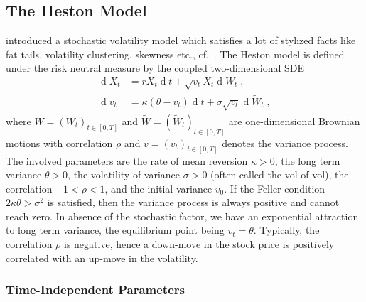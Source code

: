 \documentclass[10pt,a4paper]{article}
\numberwithin{equation}{section} %
\theoremstyle{plain}
\theoremstyle{definition}
\theoremstyle{remark}
\def\D{\dif\!}
\def\tT{\ensuremath{{t\in\left[0,T\right]}}}
\DeclareMathOperator{\dif}{d}
\begin{document}
\subsection{The Heston Model}
\label{subsec:TheHestonmodel}

\cite{He93} introduced a stochastic volatility model which satisfies a lot of stylized facts like fat tails, volatility clustering, skewness etc., cf.~\cite{Co01}. The Heston model is defined under the risk neutral measure by the coupled two-dimensional SDE
\begin{align}
\label{eq:SDE_Heston}
\D X_t&=rX_t\D t+ \sqrt{v_t}X_t\D W_t\;,\\
\label{eq:SDE_Heston2}
\D v_t&=\kappa(\theta-v_t)\D t+ \sigma\sqrt{v_t}\D \widetilde{W}_t\;,
\end{align} 
where $W=(W_t)_{\tT}$ and $\widetilde{W}=(\widetilde{W}_t)_{\tT}$ are one-dimensional Brownian motions with correlation $\rho$ and $v=(v_t)_{\tT}$ denotes the variance process. The involved parameters are the rate of mean reversion $\kappa > 0$, the long term variance $\theta > 0$, the volatility of variance $\sigma > 0$ (often called the vol of vol), the correlation $-1 < \rho <1$, and the initial variance $v_0$. If the Feller condition $2\kappa\theta > \sigma^{2}$ is satisfied, then the variance process is always positive and cannot reach zero. In absence of the stochastic factor, we have an exponential attraction to long term variance, the equilibrium point being $v_t = \theta$. Typically, the correlation $\rho$ is negative, hence a down-move in the stock price is positively correlated with an up-move in the volatility.

\subsubsection{Time-Independent Parameters}
\label{subsubsec:TimeIndependentParameters}
\end{document}
